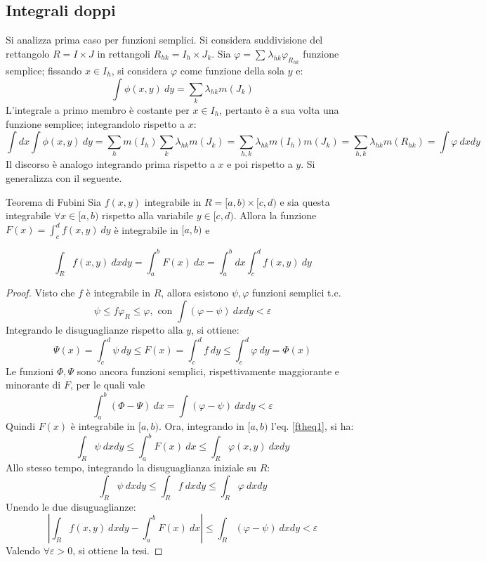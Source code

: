 \documentclass[11pt, a4paper]{scrartcl}
\theoremstyle{definition}
\numberwithin{esempio}{section}
\theoremstyle{definition}
\numberwithin{obs}{section}
\numberwithin{nota}{section}
\numberwithin{equation}{subsection}
\begin{document}
\subsection{Integrali doppi}
Si analizza prima caso per funzioni semplici. 
Si considera suddivisione del rettangolo $R=I\times J$ in rettangoli $R_{hk} = I_h \times J_k$.
Sia $\varphi = \sum_{}^{} \lambda _{hk}\varphi _{R_{hk} } $ funzione semplice; fissando $x \in I_h$, si considera $\varphi $ come funzione della sola $y$ e:
\[
\int \phi (x,y) \ dy = \sum_{k}^{} \lambda _{hk} m(J_k)
\]
L'integrale a primo membro \`e costante per $x \in I_h$, pertanto \`e a sua volta una funzione semplice; integrandolo rispetto a $x$:
\[
\int dx \int \phi (x,y) \ dy = \sum_{h}^{} m(I_h) \sum_{k}^{} \lambda _{hk} m(J_k)= \sum_{h,k}^{} \lambda _{hk} m(I_h)m(J_k) = \sum_{h,k}^{} \lambda _{hk} m(R_{hk} )= \int\varphi  \ dxdy
\] 
Il discorso \`e analogo integrando prima rispetto a $x$ e poi rispetto a $y$. 
Si generalizza con il seguente.
\begin{teorema}
	{Teorema di Fubini}{}
	Sia $f(x,y)$ integrabile in $R = [a,b) \times [c,d)$ e sia questa integrabile $\forall x \in [a,b)$ rispetto alla variabile $y \in [c,d)$. 
	Allora la funzione $F(x) = \int_{c} ^d f(x,y) \ dy$ \`e integrabile in $[a,b)$ e 

	\[
	\int_{R} f(x,y) \ dxdy = \int_{a} ^b F(x) \ dx = \int_{a} ^b dx \int_{c} ^d f(x,y) \ dy
	\] 
\begin{proof}
	Visto che $f$ \`e integrabile in $R$, allora esistono $\psi , \varphi $ funzioni semplici t.c.
	\[
	\psi \le f \varphi _R \le \varphi, \text{ con }   \int (\varphi -\psi ) \ dxdy < \varepsilon 
	\] 
	Integrando le disuguaglianze rispetto alla $y$, si ottiene:
	\begin{equation}\label{ftheq1}
	\Psi(x) = \int_c^d \psi \ dy \le F(x) = \int_{c} ^d f\ dy \le \int_{c} ^d \varphi \ dy = \Phi(x)
	\end{equation}
	Le funzioni $\Phi,\Psi$ sono ancora funzioni semplici, rispettivamente maggiorante e minorante di $F$, per le quali vale
	\[
	\int_{a} ^b (\Phi-\Psi) \ dx = \int (\varphi -\psi ) \ dxdy < \varepsilon 
	\] 
	Quindi $F(x)$ \`e integrabile in $[a,b)$.
	Ora, integrando in $[a,b)$ l'eq. \ref{ftheq1}, si ha:
	\[
	\int_{R} \psi  \ dxdy \le \int_{a} ^b F(x) \ dx \le  \int_{R} \varphi (x,y) \ dxdy
	\] 
	Allo stesso tempo, integrando la disuguaglianza iniziale su $R$:
	\[
	\int_{R} \psi  \ dxdy \le \int_{R} f \ dxdy \le \int_R \varphi  \ dxdy
	\] 
	Unendo le due disuguaglianze:
\[
\left\lvert \int_{R} f(x,y)\ dxdy - \int_{a} ^b F(x) \ dx \right\rvert \le \int_{R} (\varphi -\psi ) \ dxdy < \varepsilon
\] 
Valendo $\forall \varepsilon >0$, si ottiene la tesi.
\end{proof}	
\end{teorema}
\end{document}
